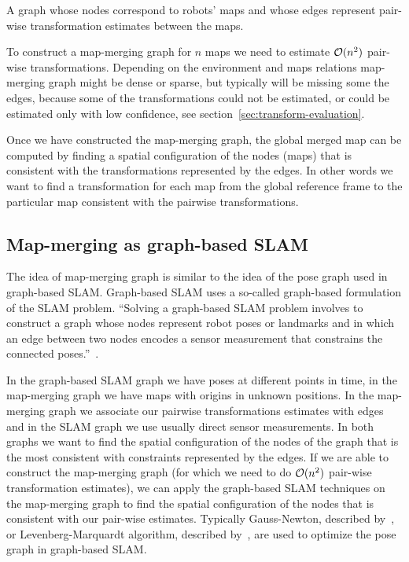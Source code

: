 \begin{defn}
    \label{def:map-merging-graph}
    A graph whose nodes correspond to robots' maps and whose edges represent pair-wise transformation estimates between the maps.
\end{defn}

To construct a map-merging graph for $n$ maps we need to estimate $\operatorname{\mathcal{O}}(n^2)$ pair-wise transformations. Depending on the environment and maps relations map-merging graph might be dense or sparse, but typically will be missing some the edges, because some of the transformations could not be estimated, or could be estimated only with low confidence, see section~\ref{sec:transform-evaluation}.

Once we have constructed the map-merging graph, the global merged map can be computed by finding a spatial configuration of the nodes (maps) that is consistent with the transformations represented by the edges. In other words we want to find a transformation for each map from the global reference frame to the particular map consistent with the pairwise transformations.

\subsection{Map-merging as graph-based SLAM}

The idea of map-merging graph is similar to the idea of the pose graph used in graph-based \gls{SLAM}. Graph-based \gls{SLAM} uses a so-called graph-based formulation of the \gls{SLAM} problem. ``Solving a graph-based \gls{SLAM} problem involves to construct a graph whose nodes represent robot poses or landmarks and in which an edge between two nodes encodes a sensor measurement that constrains the connected poses.''~\citep{grisetti2010tutorial}.

In the graph-based \gls{SLAM} graph we have poses at different points in time, in the map-merging graph we have maps with origins in unknown positions. In the map-merging graph we associate our pairwise transformations estimates with edges and in the \gls{SLAM} graph we use usually direct sensor measurements. In both graphs we want to find the spatial configuration of the nodes of the graph that is the most consistent with constraints represented by the edges. If we are able to construct the map-merging graph (for which we need to do $\operatorname{\mathcal{O}}(n^2)$ pair-wise transformation estimates), we can apply the graph-based \gls{SLAM} techniques on the map-merging graph to find the spatial configuration of the nodes that is consistent with our pair-wise estimates. Typically Gauss-Newton, described by~\citet{fletcher2013practical}, or Levenberg-Marquardt algorithm, described by~\citet{more1978levmarq}, are used to optimize the pose graph in graph-based \gls{SLAM}.

